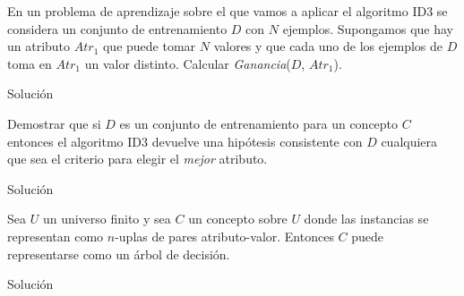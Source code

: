 \documentclass{mulcia_aa}
\begin{document}
\begin{question}
En un problema de aprendizaje sobre el que vamos a aplicar el algoritmo ID3 se considera un conjunto de entrenamiento $D$ con $N$ ejemplos. Supongamos que hay un atributo $Atr_1$ que puede tomar $N$ valores y que cada uno de los ejemplos de $D$ toma en $Atr_1$ un valor distinto. Calcular \emph{Ganancia}($D$, $Atr_1$).
\end{question}
\begin{solution}
Solución
\end{solution}

\begin{question}
Demostrar que si $D$ es un conjunto de entrenamiento para un concepto $C$ entonces el algoritmo ID3 devuelve una hipótesis consistente con $D$ cualquiera que sea el criterio para elegir el \emph{mejor} atributo.
\end{question}
\begin{solution}
Solución
\end{solution}

\begin{question}
Sea $U$ un universo finito y sea $C$ un concepto sobre $U$ donde las instancias se representan como $n$-uplas de pares atributo-valor. Entonces $C$ puede representarse como un árbol de decisión.
\end{question}
\begin{solution}
Solución
\end{solution}
\end{document}
